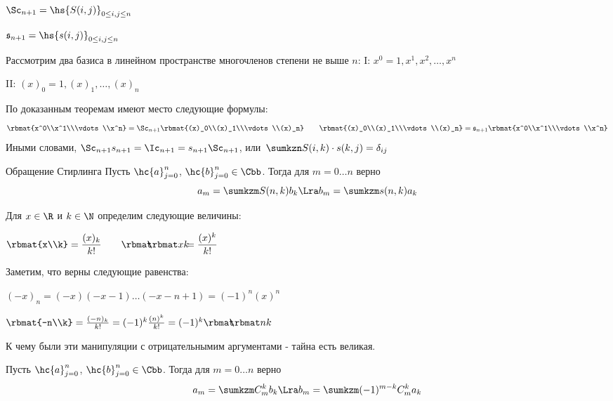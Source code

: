 \documentclass[unicode, 10pt, a4paper, oneside, fleqn]{article}
\begin{document}
\begin{denote}
  $\displaystyle \Sc_{n+1}=\hs{S(i,j)}_{0\le i,j \le n}$\par
  $\mathfrak{s}_{n+1} = \hs{s(i,j)}_{0\le i,j \le n}$
\end{denote}
Рассмотрим два базиса в линейном пространстве многочленов степени не выше $n$:
I: $\displaystyle x^0=1, x^1, x^2, \dots, x^n$ \par
II: $\displaystyle (x)_0=1, (x)_1,\dots, (x)_n$ \par 
По доказанным теоремам имеют место следующие формулы:
\begin{displaymath}
  \rbmat{x^0\\x^1\\\vdots\\x^n} = \Sc_{n+1}\rbmat{(x)_0\\(x)_1\\\vdots\\(x)_n}\qquad
  \rbmat{(x)_0\\(x)_1\\\vdots\\(x)_n} = \mathfrak{s}_{n+1}\rbmat{x^0\\x^1\\\vdots\\x^n}
\end{displaymath}
Иными словами, $\displaystyle \Sc_{n+1}s_{n+1} = \Ic_{n+1} = s_{n+1}\Sc_{n+1}$, или\ 
$\displaystyle \sumkzn S(i,k)\cdot s(k,j) = \delta_{ij}$
\begin{lemma}{Обращение Стирлинга}
  Пусть $\hc{a}_{j=0}^n$, $\hc{b}_{j=0}^n \in \Cbb$. Тогда для \linebreak $m=0\dots n$ верно
  \begin{displaymath}
    a_m=\sumkzm S(n,k)b_k \Lra b_m=\sumkzm s(n,k)a_k
  \end{displaymath}
\end{lemma}
\begin{denote}
  Для $x\in\R$ и $k\in\N$ определим следующие величины:\par
  $\displaystyle \rbmat{x\\k} = \frac{(x)_k}{k!}\qquad \cnka{x}{k}=\frac{(x)^k}{k!}$
\end{denote}
Заметим, что верны следующие равенства:\par
$\displaystyle (-x)_n=(-x)(-x-1)\dots (-x-n+1) = (-1)^n(x)^n$\par
$\rbmat{-n\\k} = \frac{(-n)_k}{k!}=(-1)^k\frac{(n)^k}{k!}=(-1)^k\cnka{n}{k}$
\begin{authornote}
  К чему были эти манипуляции с отрицательнымим аргументами - тайна есть великая.
\end{authornote}
\begin{problem}
  Пусть $\hc{a}_{j=0}^n$, $\hc{b}_{j=0}^n \in \Cbb$. Тогда для $m=0\dots n$ верно
  \begin{displaymath}
    a_m=\sumkzm C_m^kb_k \Lra b_m=\sumkzm (-1)^{m-k}C_m^ka_k
  \end{displaymath}
\end{problem}
\end{document}
